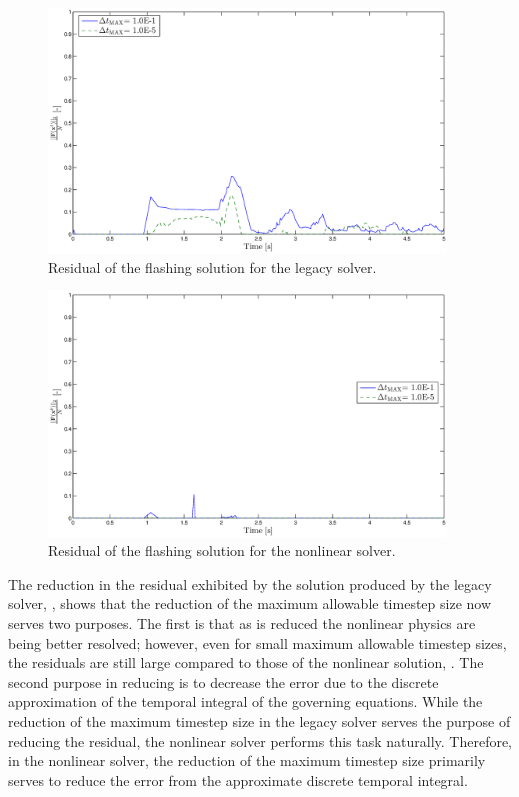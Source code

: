 \begin{figure}[h!t]
\centering
\includegraphics[width=0.94\textwidth]{images/cobra_flashing_res_compare.eps}
\caption{Residual of the flashing solution for the legacy solver.}
\label{fig:legacy_flashing_residual}
\end{figure}

\begin{figure}[h!t]
\centering
\includegraphics[width=0.94\textwidth]{images/nl_flashing_res_compare.eps}
\caption{Residual of the flashing solution for the nonlinear solver.}
\label{fig:nonlinear_flashing_residual}
\end{figure}

The reduction in the residual exhibited by the solution produced by the legacy solver, , shows that the reduction of the maximum allowable timestep size now serves two purposes.
The first is that as \dtmax{} is reduced the nonlinear physics are being better resolved; however, even for small maximum allowable timestep sizes, the residuals are still large compared to those of the nonlinear solution, .
The second purpose in reducing \dtmax{} is to decrease the error due to the discrete approximation of the temporal integral of the governing equations.
While the reduction of the maximum timestep size in the legacy solver serves the purpose of reducing the residual, the nonlinear solver performs this task naturally.
Therefore, in the nonlinear solver, the reduction of the maximum timestep size primarily serves to reduce the error from the approximate discrete temporal integral.

